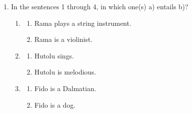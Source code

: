 \documentclass[12pt]{article}
\theoremstyle{remark}
\begin{document}
\begin{enumerate}
\begin{enumerate}
\end{enumerate}
\hfill{}
\item In the sentences 1 through 4, in which one(s) a) entails b)?
\begin{multicols}{2}
    \begin{enumerate}
        \item 
        \begin{enumerate}[topsep=0pt, itemsep=0pt, parsep=0pt]
            \item Rama plays a string instrument.
            \item Rama is a violinist.
        \end{enumerate}

        \item 
        \begin{enumerate}[topsep=0pt, itemsep=0pt, parsep=0pt]
            \item Hutolu sings.
            \item Hutolu is melodious.
        \end{enumerate}
        
        \columnbreak

        \item 
        \begin{enumerate}[topsep=0pt, itemsep=0pt, parsep=0pt]
            \item Fido is a Dalmatian.
            \item Fido is a dog.
        \end{enumerate}


\end{enumerate}
\end{multicols}
\end{enumerate}
\end{document}
